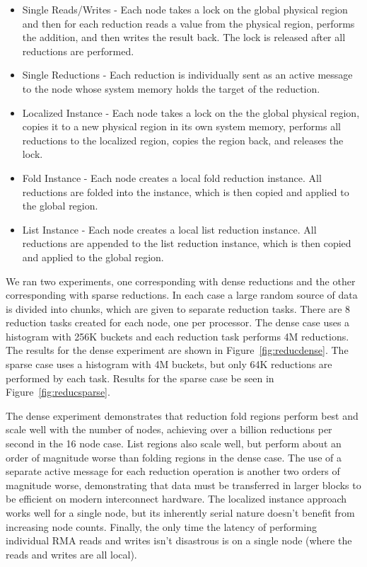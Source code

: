 \begin{itemize} \itemsep1pt \parskip0pt 
\item Single Reads/Writes - Each node takes a lock on the global physical region and then for each reduction
reads a value from the physical region, performs the addition, and then writes the result back.  
The lock is released after all reductions are performed.
\item Single Reductions - Each reduction is individually sent as an active message to the node whose
system memory holds the target of the reduction.
\item Localized Instance - Each node takes a lock on the the global physical region, copies it to a new physical
region in its own system memory, performs all reductions to the localized region, copies the region back, and releases the lock.
\item Fold Instance - Each node creates a local fold reduction instance.
All reductions are folded into the instance, which is then copied and applied to the global region.
\item List Instance - Each node creates a local list reduction instance.
All reductions are appended to the list reduction instance, which is then copied and applied to the global region.
\end{itemize}

We ran two experiments, one corresponding with dense reductions and the other corresponding with sparse
reductions.  In each case a large random source of data is divided into chunks, which are given to
separate reduction tasks.  There are 8 reduction tasks created for each node, one per processor.  The dense
case uses a histogram with 256K buckets and each reduction task performs 4M reductions.  The results for the
dense experiment are shown in Figure~\ref{fig:reducdense}.  The sparse case uses a histogram with 4M buckets,
but only 64K reductions are performed by each task.  Results for the sparse case
be seen in Figure~\ref{fig:reducsparse}.

The dense experiment demonstrates that reduction fold regions perform 
best and scale well with the number of nodes, achieving over a billion reductions
per second in the 16 node case.  List regions also scale well, but perform about an
order of magnitude worse than folding regions in the dense case.  The use of a separate active message for
each reduction operation is another two orders of magnitude worse, demonstrating that data must be
transferred in larger blocks to be efficient on modern interconnect hardware.  The localized instance approach
works well for a single node, but its inherently serial nature doesn't benefit from increasing node counts.  Finally, the only time the latency of performing individual RMA reads and writes isn't disastrous is
on a single node (where the reads and writes are all local).

